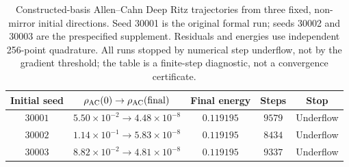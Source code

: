 \begin{table}[t]
\centering
\small
\setlength{\tabcolsep}{5pt}
\begin{tabular}{@{}ccccc@{}}
\hline
Initial seed & $\rho_{\rm AC}(0)\to\rho_{\rm AC}(\mathrm{final})$ & Final energy & Steps & Stop \\
\hline
$30001$ & $5.50\times10^{-2}\to4.48\times10^{-8}$ & $0.119195$ & $9579$ & Underflow \\
$30002$ & $1.14\times10^{-1}\to5.83\times10^{-8}$ & $0.119195$ & $8434$ & Underflow \\
$30003$ & $8.82\times10^{-2}\to4.81\times10^{-8}$ & $0.119195$ & $9337$ & Underflow \\
\hline
\end{tabular}
\caption{Constructed-basis Allen--Cahn Deep Ritz trajectories from three fixed, non-mirror initial directions. Seed 30001 is the original formal run; seeds 30002 and 30003 are the prespecified supplement. Residuals and energies use independent 256-point quadrature. All runs stopped by numerical step underflow, not by the gradient threshold; the table is a finite-step diagnostic, not a convergence certificate.}
\label{tab:ex2-c-supplement}
\end{table}
